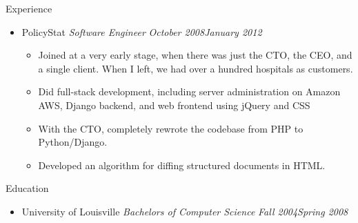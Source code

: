 \documentclass[11pt,oneside]{article}
\newenvironment{ressection}[1]{
    \textrm{\Large#1}
    \begin{itemize}
}{
    \end{itemize}
}
\newcommand{\ressubitem}[1]{
    \item \begin{flushleft} \textsf{#1} \end{flushleft}
}
\newcommand{\resbigitem}[3]{
    \item
    \textrm{#1}
    \hspace{5pt}
    \textit{#2}
    \hfill
    \textit{#3}
}
\newenvironment{ressubsec}[3]{
    \resbigitem{#1}{#2}{#3}
    \begin{itemize}
}{
    \end{itemize}
}
\begin{document}
\begin{ressection}{Experience}
    \begin{ressubsec}{PolicyStat}{Software Engineer}{October 2008\textendash January 2012}
        \ressubitem{Joined at a very early stage, when there was just the CTO, the CEO, and a single client. When I left, we had over a hundred hospitals as customers.}
        \ressubitem{Did full-stack development, including server administration on Amazon AWS, Django backend, and web frontend using jQuery and CSS}
        \ressubitem{With the CTO, completely rewrote the codebase from PHP to Python/Django.}
        \ressubitem{Developed an algorithm for diffing structured documents in HTML.}
    \end{ressubsec}

\end{ressection}


\begin{ressection}{Education}

  \resbigitem{University of Louisville}{Bachelors of Computer Science}{Fall 2004\textendash Spring 2008}

\end{ressection}
\end{document}
